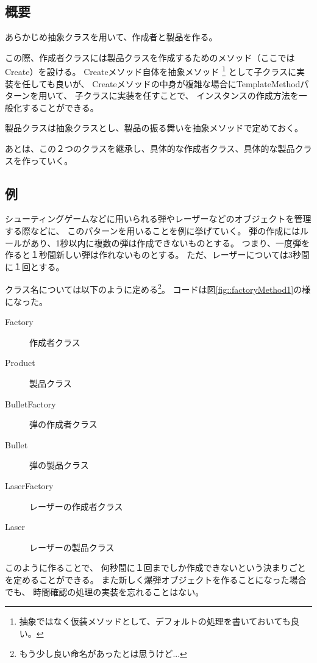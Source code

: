 \documentclass[11pt]{jsarticle}
\begin{document}
			\subsection{概要}
				あらかじめ抽象クラスを用いて、作成者と製品を作る。
				
				この際、作成者クラスには製品クラスを作成するためのメソッド（ここではCreate）を設ける。
				Createメソッド自体を抽象メソッド
				\footnote{抽象ではなく仮装メソッドとして、デフォルトの処理を書いておいても良い。}
				として子クラスに実装を任しても良いが、
				Createメソッドの中身が複雑な場合にTemplateMethodパターンを用いて、
				子クラスに実装を任すことで、
				インスタンスの作成方法を一般化することができる。
				
				製品クラスは抽象クラスとし、製品の振る舞いを抽象メソッドで定めておく。
				
				あとは、この２つのクラスを継承し、具体的な作成者クラス、具体的な製品クラスを作っていく。
				
			\subsection{例}
				シューティングゲームなどに用いられる弾やレーザーなどのオブジェクトを管理する際などに、
				このパターンを用いることを例に挙げていく。
				弾の作成にはルールがあり、1秒以内に複数の弾は作成できないものとする。
				つまり、一度弾を作ると１秒間新しい弾は作れないものとする。
				ただ、レーザーについては3秒間に１回とする。
				
				クラス名については以下のように定める\footnote{もう少し良い命名があったとは思うけど...}。
				コードは図\ref{fig::factoryMethod1}の様になった。
				\begin{description}
					\item[Factory]{作成者クラス}
					\item[Product]{製品クラス}
					\item[BulletFactory]{弾の作成者クラス}
					\item[Bullet]{弾の製品クラス}
					\item[LaserFactory]{レーザーの作成者クラス}
					\item[Laser]{レーザーの製品クラス}
				\end{description}
				
				このように作ることで、
				何秒間に１回までしか作成できないという決まりごとを定めることができる。
				また新しく爆弾オブジェクトを作ることになった場合でも、
				時間確認の処理の実装を忘れることはない。
				
\end{document}
